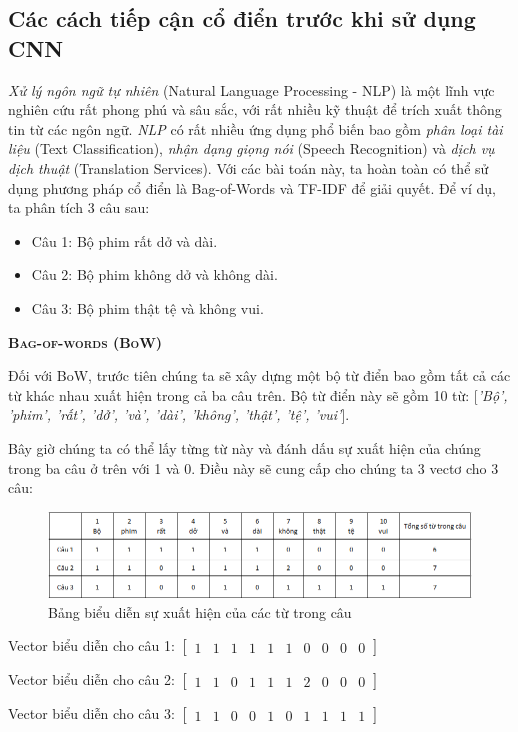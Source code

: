 \subsection{Các cách tiếp cận cổ điển trước khi sử dụng CNN}
\textit{Xử lý ngôn ngữ tự nhiên} (Natural Language Processing - NLP) là một lĩnh vực nghiên cứu rất phong phú và sâu sắc, với rất nhiều kỹ thuật để trích xuất thông tin từ các ngôn ngữ. \textit{NLP} có rất nhiều ứng dụng phổ biến bao gồm \textit{phân loại tài liệu} (Text Classification), \textit{nhận dạng giọng nói} (Speech Recognition) và \textit{dịch vụ dịch thuật} (Translation Services). Với các bài toán này, ta hoàn toàn có thể sử dụng phương pháp cổ điển là Bag-of-Words và TF-IDF để giải quyết. Để ví dụ, ta phân tích 3 câu sau:
\begin{itemize}
  \item Câu 1: Bộ phim rất dở và dài.
  \item Câu 2: Bộ phim không dở và không dài.
  \item Câu 3: Bộ phim thật tệ và không vui.
\end{itemize}

\textbf{\textsc{Bag-of-words (BoW)}}

Đối với BoW, trước tiên chúng ta sẽ xây dựng một bộ từ điển bao gồm tất cả các từ khác nhau xuất hiện trong cả ba câu trên. Bộ từ điển này sẽ gồm 10 từ: [\textit{'Bộ', 'phim', 'rất', 'dở', 'và', 'dài', 'không', 'thật', 'tệ', 'vui'}].

Bây giờ chúng ta có thể lấy từng từ này và đánh dấu sự xuất hiện của chúng trong ba câu ở trên với 1 và 0. Điều này sẽ cung cấp cho chúng ta 3 vectơ cho 3 câu:

\begin{figure}[!h]
	\centering
		\includegraphics[width=1\columnwidth]{books/artificial-neural-network/chapter05/figure/BoW.PNG}
        \caption{Bảng biểu diễn sự xuất hiện của các từ trong câu}
        \label{fig:BoW}
\end{figure}

\begin{center}
    Vector biểu diễn cho câu 1:
    $\begin{bmatrix}
        1 & 1 & 1 & 1 & 1 & 1 & 0 & 0 & 0 & 0
    \end{bmatrix}$

    Vector biểu diễn cho câu 2:
    $\begin{bmatrix}
      1 & 1 & 0 & 1 & 1 & 1 & 2 & 0 & 0 & 0
    \end{bmatrix}$

    Vector biểu diễn cho câu 3:
    $\begin{bmatrix}
      1 & 1 & 0 & 0 & 1 & 0 & 1 & 1 & 1 & 1
    \end{bmatrix}$
\end{center}

